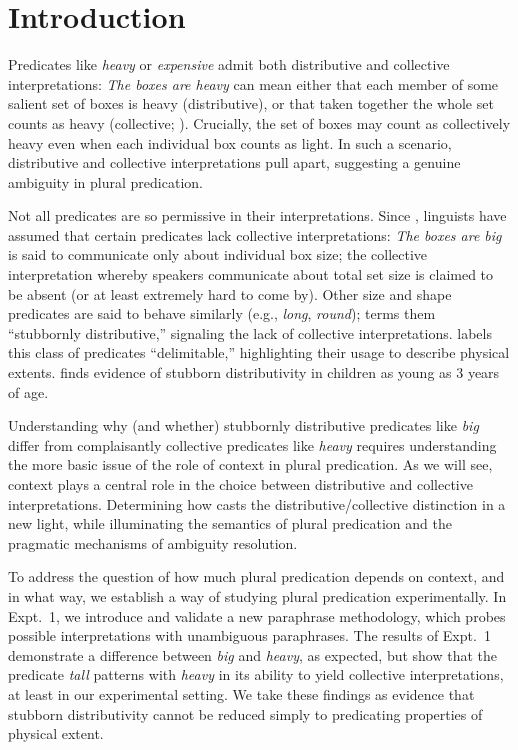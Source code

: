 \documentclass[linguex]{sp}
\begin{document}
\section{Introduction}

Predicates like \textit{heavy} or \textit{expensive} admit both distributive and collective interpretations: \textit{The boxes are heavy} can mean either that each member of some salient set of boxes is heavy (distributive), or that taken together the whole set counts as heavy (collective; \citealp{scha1984}). Crucially, the set of boxes may count as collectively heavy even when each individual box counts as light. In such a scenario, distributive and collective interpretations pull apart, suggesting a genuine ambiguity in plural predication.

Not all predicates are so permissive in their interpretations. Since \citet[140]{quine1960}, linguists have assumed that certain predicates lack collective interpretations: \textit{The boxes are big} is said to communicate only about individual box size; the collective interpretation whereby speakers communicate about total set size is claimed to be absent (or at least extremely hard to come by). Other size and shape predicates are said to behave similarly (e.g., \emph{long}, \emph{round}); \cite{schwarzschild2011} terms them ``stubbornly distributive,'' signaling the lack of collective interpretations. \citet{zhang2013} labels this class of predicates ``delimitable,'' highlighting their usage to describe physical extents. \cite{syrett2015} finds evidence of stubborn distributivity in children as young as 3 years of age.

Understanding why (and whether) stubbornly distributive predicates like \emph{big} differ from complaisantly collective predicates like \emph{heavy} requires understanding the more basic issue of the role of context in plural predication. As we will see, context plays a central role in the choice between distributive and collective interpretations. Determining how casts the distributive/collective distinction in a new light, while illuminating the semantics of plural predication and the pragmatic mechanisms of ambiguity resolution. 

To address the question of how much plural predication depends on context, and in what way, we establish a way of studying plural predication experimentally. In Expt.~1, we introduce and validate a new paraphrase methodology, which probes possible interpretations with unambiguous paraphrases. The results of Expt.~1 demonstrate a difference between \emph{big} and \emph{heavy}, as expected, but show that the predicate \emph{tall} patterns with \emph{heavy} in its ability to yield collective interpretations, at least in our experimental setting. We take these findings as evidence that stubborn distributivity cannot be reduced simply to predicating properties of physical extent.
\end{document}

